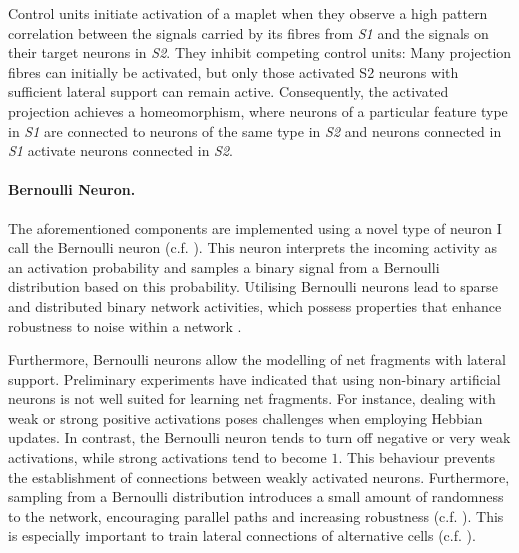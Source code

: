 Control units initiate activation of a maplet when they observe a high pattern correlation between the signals carried by its fibres from \emph{S1} and the signals on their target neurons in \emph{S2}. They inhibit competing control units: Many projection fibres can initially be activated, but only those activated S2 neurons with sufficient lateral support can remain active.
Consequently, the activated projection achieves a homeomorphism, where neurons of a particular feature type in \emph{S1} are connected to neurons of the same type in \emph{S2} and neurons connected in \emph{S1} activate neurons connected in \emph{S2}.

\paragraph{Bernoulli Neuron.} The aforementioned components are implemented using a novel type of neuron I call the Bernoulli neuron (c.f. ). This neuron interprets the incoming activity as an activation probability and samples a binary signal from a Bernoulli distribution based on this probability. Utilising Bernoulli neurons lead to sparse and distributed binary network activities, which possess properties that enhance robustness to noise within a network .

Furthermore, Bernoulli neurons allow the modelling of net fragments with lateral support. Preliminary experiments have indicated that using non-binary artificial neurons is not well suited for learning net fragments. For instance, dealing with weak or strong positive activations poses challenges when employing Hebbian updates. In contrast, the Bernoulli neuron tends to turn off negative or very weak activations, while strong activations tend to become $1$. This behaviour prevents the establishment of connections between weakly activated neurons. Furthermore, sampling from a Bernoulli distribution introduces a small amount of randomness to the network, encouraging parallel paths and increasing robustness (c.f. ). This is especially important to train lateral connections of alternative cells (c.f. ).


